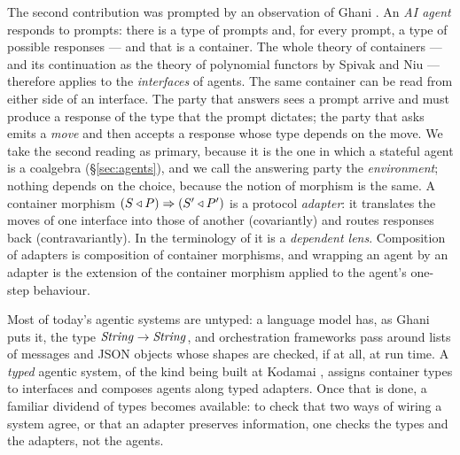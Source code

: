 \documentclass{fundam}
\begin{document}
The second contribution was prompted by an observation of Ghani \cite{GhaniPodcast26}.
An \emph{AI agent} responds to prompts: there is a type of prompts and, for every prompt,
a type of possible responses --- and that is a container.  The whole theory of containers
--- and its continuation as the theory of polynomial functors by Spivak and
Niu \cite{Spivak20,NiuSpivak25} --- therefore applies to the \emph{interfaces} of agents.
The same container can be read from either side of an interface.  The party that answers
sees a prompt arrive and must produce a response of the type that the prompt dictates; the
party that asks emits a \emph{move} and then accepts a response whose type depends on the
move.  We take the second reading as primary, because it is the one in which a stateful
agent is a coalgebra (\S\ref{sec:agents}), and we call the answering party the
\emph{environment}; nothing depends on the choice, because the notion of morphism is the
same.  A container morphism $(S \triangleleft P) \Rightarrow (S' \triangleleft P')$ is a protocol
\emph{adapter}: it translates the moves of one interface into those of another
(covariantly) and routes responses back (contravariantly).  In the terminology of
\cite{NiuSpivak25} it is a \emph{dependent lens}.  Composition of adapters is composition
of container morphisms, and wrapping an agent by an adapter is the extension of the
container morphism applied to the agent's one-step behaviour.

Most of today's agentic systems are untyped: a language model has, as Ghani puts it, the
type $\mathit{String} \to \mathit{String}$, and orchestration frameworks pass around lists of
messages and JSON objects whose shapes are checked, if at all, at run time.  A
\emph{typed} agentic system, of the kind being built at Kodamai
\cite{KodamaiEEJ26,GhaniPodcast26}, assigns container types to interfaces and composes
agents along typed adapters.  Once that is done, a familiar dividend of types becomes
available: to check that two ways of wiring a system agree, or that an adapter preserves
information, one checks the types and the adapters, not the agents.
\end{document}

